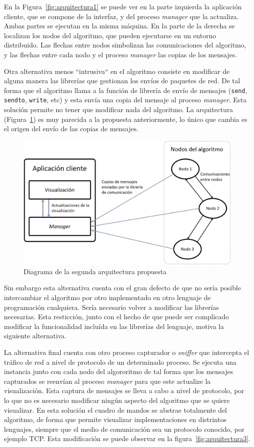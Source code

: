 En la Figura~\ref{fig:arquitectura1} se puede ver en la parte izquierda la aplicación cliente, que se compone de la interfaz, y del proceso \textit{manager} que la actualiza. Ambas partes se ejecutan en la misma máquina. En la parte de la derecha se localizan los nodos del algoritmo, que pueden ejecutarse en un entorno distribuido. Las flechas entre nodos simbolizan las comunicaciones del algoritmo, y las flechas entre cada nodo y el proceso \textit{manager} las copias de los mensajes.

Otra alternativa menos ``intrusiva`` en el algoritmo consiste en modificar de alguna manera las librerías que gestionan los envíos de paquetes de red. De tal forma que el algoritmo llama a la función de librería de envío de mensajes (\texttt{send}, \texttt{sendto}, \texttt{write}, etc) y esta envía una copia del mensaje al proceso \textit{manager}. Esta solución permite no tener que modificar nada del algoritmo. La arquitectura (Figura~\ref{fig:arquitectura2}) es muy parecida a la propuesta anteriormente, lo único que cambia es el origen del envío de las copias de mensajes.

\begin{figure}[h]
  \centering
  \includegraphics[width=0.7\linewidth]{imagenes/arquitectura2}
  \caption{Diagrama de la segunda arquitectura propuesta}
  \label{fig:arquitectura2}
\end{figure}

\newpage

Sin embargo esta alternativa cuenta con el gran defecto de que no sería posible intercambiar el algoritmo por otro implementado en otro lenguaje de programación cualquiera. Sería necesario volver a modificar las librerías necesarias. Esta resticción, junto con el hecho de que puede ser complicado modificar la funcionalidad incluída en las librerías del lenguaje, motiva la siguiente alternativa.

La alternativa final cuenta con otro proceso capturador o \textit{sniffer} que intercepta el tráfico de red a nivel de protocolo de un determinado proceso. Se ejecuta una instancia junto con cada nodo del algororitmo de tal forma que los mensajes capturados se reenvían al proceso \textit{manager} para que este actualize la visualización. Esta captura de mensajes se lleva a cabo a nivel de protocolo, por lo que no es necesario modificar ningún aspecto del algoritmo que se quiere visualizar. En esta solución el cuadro de mandos se abstrae totalmente del algoritmo, de forma que permite visualizar implementaciones en distrintos lenguajes, siempre que el medio de comunicación sea un protocolo conocido, por ejemplo TCP. Esta modificación se puede observar en la figura~\ref{fig:arquitectura3}.


